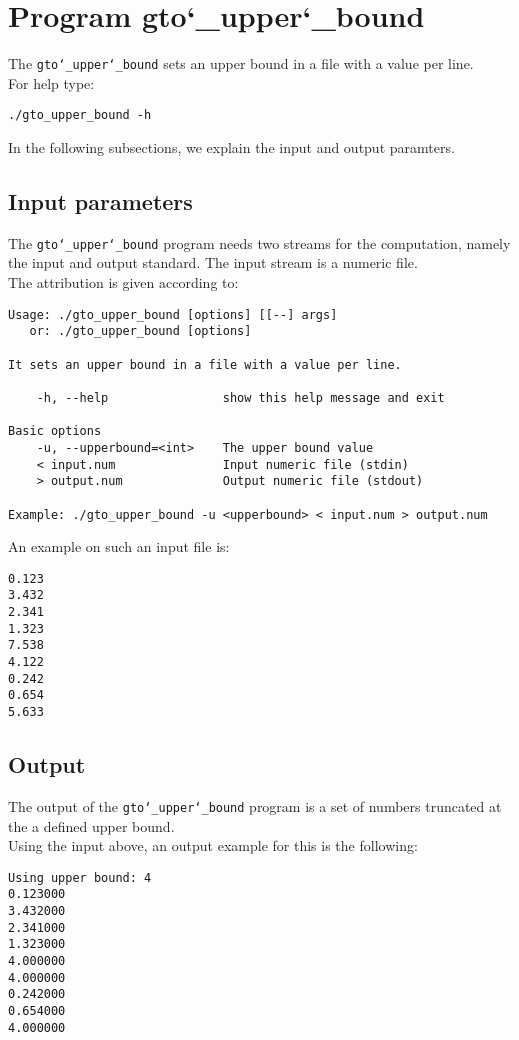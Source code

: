 \section{Program gto\char`_upper\char`_bound}
The \texttt{gto\char`_upper\char`_bound} sets an upper bound in a file with a value per line.\\
For help type:
\begin{lstlisting}
./gto_upper_bound -h
\end{lstlisting}
In the following subsections, we explain the input and output paramters.

\subsection*{Input parameters}

The \texttt{gto\char`_upper\char`_bound} program needs two streams for the computation, namely the input and output standard. The input stream is a numeric file.\\
The attribution is given according to:
\begin{lstlisting}
Usage: ./gto_upper_bound [options] [[--] args]
   or: ./gto_upper_bound [options]

It sets an upper bound in a file with a value per line.

    -h, --help                show this help message and exit

Basic options
    -u, --upperbound=<int>    The upper bound value
    < input.num               Input numeric file (stdin)
    > output.num              Output numeric file (stdout)

Example: ./gto_upper_bound -u <upperbound> < input.num > output.num
\end{lstlisting}
An example on such an input file is:
\begin{lstlisting}
0.123
3.432
2.341
1.323
7.538
4.122
0.242
0.654
5.633
\end{lstlisting}

\subsection*{Output}
The output of the \texttt{gto\char`_upper\char`_bound} program is a set of numbers truncated at the a defined upper bound.\\
Using the input above, an output example for this is the following:
\begin{lstlisting}
Using upper bound: 4
0.123000
3.432000
2.341000
1.323000
4.000000
4.000000
0.242000
0.654000
4.000000
\end{lstlisting}